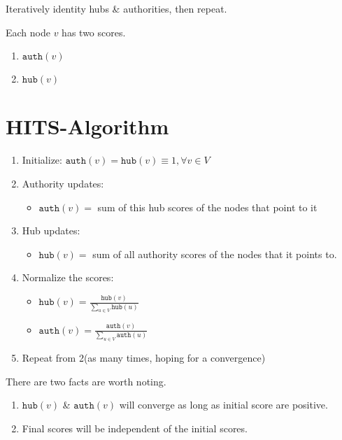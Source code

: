 Iteratively identity hubs \& authorities, then repeat.

Each node \(v\) has two scores.
\begin{enumerate}
	\item \(\texttt{auth}(v)\)
	\item \(\texttt{hub}(v)\)
\end{enumerate}

\section{HITS-Algorithm}
\begin{enumerate}
	\item Initialize: \(\texttt{auth}(v) = \texttt{hub}(v) \equiv 1, \forall v\in V\)
	\item Authority updates:
	      \begin{itemize}
		      \item \(\texttt{auth}(v) = \) sum of this hub scores of the nodes that point to it
	      \end{itemize}
	\item Hub updates:
	      \begin{itemize}
		      \item \(\texttt{hub}(v) = \) sum of all authority scores of the nodes that it points to.
	      \end{itemize}
	\item Normalize the scores:
	      \begin{itemize}
		      \item \(\texttt{hub}(v) = \frac{\texttt{hub}(v)}{\sum\limits_{u\in V} \texttt{hub}(u) }\)
		      \item \(\texttt{auth}(v) = \frac{\texttt{auth}(v)}{\sum\limits_{u\in V} \texttt{auth}(u) }\)
	      \end{itemize}
	\item Repeat from 2(as many times, hoping for a convergence)
\end{enumerate}

\begin{note}
	There are two facts are worth noting.
	\begin{enumerate}
		\item \(\texttt{hub}(v)\) \& \(\texttt{auth}(v)\) will converge as long as initial score are positive.
		\item Final scores will be independent of the initial scores.
	\end{enumerate}
\end{note}
